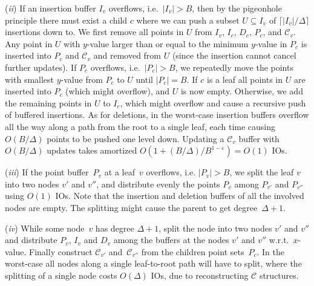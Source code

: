 \documentclass[11pt]{article}
\begin{document}
(\textit{ii}) If an insertion buffer $I_v$ overflows, i.e.\ $|I_v|>B$,
then by the pigeonhole principle there must exist a child $c$ where we
can push a subset $U\subseteq I_v$ of $\lceil|I_v|/\Delta\rceil$
insertions down to. We first remove all points in $U$ from $I_v$,
$I_c$, $D_c$, $P_c$, and $\mathcal{C}_v$. Any point in $U$ with
$y$-value larger than or equal to the minimum $y$-value in $P_c$ is
inserted into $P_c$ and $\mathcal{C}_v$ and removed from $U$ (since
the insertion cannot cancel further updates). If $P_c$ overflows,
i.e.\ $|P_c|>B$, we repeatedly move the points with smallest $y$-value
from $P_c$ to $U$ until $|P_c|=B$.  If $c$ is a leaf all points in $U$
are inserted into $P_c$ (which might overflow), and $U$ is now
empty. Otherwise, we add the remaining points in $U$ to $I_c$, which
might overflow and cause a recursive push of buffered insertions.  As
for deletions, in the worst-case insertion buffers overflow all the
way along a path from the root to a single leaf, each time causing
$O(B/\Delta)$ points to be pushed one level down. Updating a
$\mathcal{C}_v$ buffer with $O(B/\Delta)$ updates takes amortized
$O(1+(B/\Delta)/B^{1-\varepsilon})=O(1)$ IOs.

(\textit{iii}) If the point buffer~$P_v$ at a leaf~$v$ overflows,
i.e. $|P_v|>B$, we split the leaf $v$ into two nodes $v'$ and $v''$,
and distribute evenly the points $P_v$ among $P_{v'}$ and $P_{v''}$
using $O(1)$ IOs. Note that the insertion and deletion buffers of all
the involved nodes are empty. The splitting might cause the parent to
get degree~$\Delta+1$.

(\textit{iv}) While some node~$v$ has degree $\Delta+1$, split the
node into two nodes $v'$ and $v''$ and distribute $P_v$, $I_v$ and
$D_v$ among the buffers at the nodes $v'$ and $v''$
w.r.t.\ $x$-value. Finally construct $\mathcal{C}_{v'}$
and~$\mathcal{C}_{v''}$ from the children point sets~$P_c$. In the
worst-case all nodes along a single leaf-to-root path will have to
split, where the splitting of a single node costs $O(\Delta)$ IOs, due
to reconstructing $\mathcal{C}$ structures.
\end{document}
